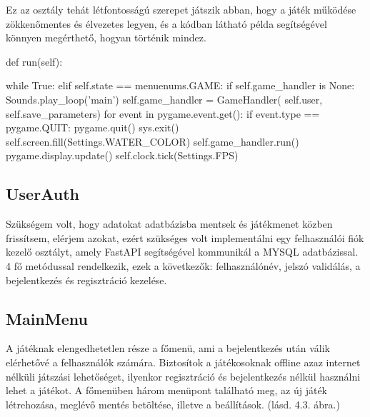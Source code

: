 Ez az osztály tehát létfontosságú szerepet játszik abban, hogy a játék működése zökkenőmentes és élvezetes legyen, és a kódban látható példa segítségével könnyen megérthető, hogyan történik mindez.


\begin{python}[caption={Játék főciklusa},label=py:főciklus]
    def run(self):

        while True:
            elif self.state == menuenums.GAME:
                if self.game_handler is None:
                    Sounds.play_loop('main')
                    self.game_handler = GameHandler(
                        self.user, self.save_parameters)
                for event in pygame.event.get():
                    if event.type == pygame.QUIT:
                        pygame.quit()
                        sys.exit()
                self.screen.fill(Settings.WATER_COLOR)
                self.game_handler.run()
                pygame.display.update()
                self.clock.tick(Settings.FPS)
\end{python}



\subsection{UserAuth}
Szükségem volt, hogy adatokat adatbázisba mentsek és játékmenet közben frissítsem, elérjem azokat, ezért szükséges volt implementálni egy felhasználói fiók kezelő osztályt, amely FastAPI segítségével kommunikál a MYSQL adatbázissal. 
4 fő metódussal rendelkezik, ezek a következők: felhasználónév, jelszó validálás, a bejelentkezés és regisztráció kezelése.


\subsection{MainMenu}

A játéknak elengedhetetlen része a főmenü, ami a bejelentkezés után válik elérhetővé a felhasználók számára. Biztosítok a játékosoknak offline azaz internet nélküli játszási lehetőséget, ilyenkor regisztráció és bejelentkezés nélkül használni lehet a játékot.
A főmenüben három menüpont található meg, az új játék létrehozása, meglévő mentés betöltése, illetve a beállítások. (lásd. 4.3. ábra.)   



